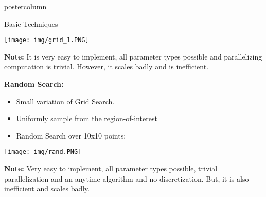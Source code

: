 \documentclass{beamer}
\begin{document}
\begin{frame}[fragile]{}
\begin{columns}
\begin{column}{.31\textwidth}
\begin{beamercolorbox}[center]{postercolumn}
\begin{minipage}{.98\textwidth}
{\begin{myblock}{Basic Techniques}
                \hspace*{1ex}
                
               \begin{center}
             \texttt{[image: img/grid\_1.PNG]}
               \end{center}
               
               \textbf{Note:} It is very easy to implement, all parameter types possible and parallelizing computation is trivial. However, it scales badly and is inefficient.\\
               
               \begin{codebox}
				\textbf{Random Search:}
				\end{codebox}
				\begin{itemize}
                    \item Small variation of Grid Search.
                    \item Uniformly sample from the region-of-interest
                    \item Random Search over 10x10 points:
                \end{itemize}
            
                \hspace*{1ex}
			    
			    \begin{center}
             \texttt{[image: img/rand.PNG]}
               \end{center}	
              \textbf{Note:} Very easy to implement, all parameter types possible, trivial parallelization and an anytime algorithm and no discretization. But, it is also inefficient and scales badly.
	    	
	    	\end{myblock}
	    	
}
\end{minipage}
\end{beamercolorbox}
\end{column}
\end{columns}
\end{frame}
\end{document}

